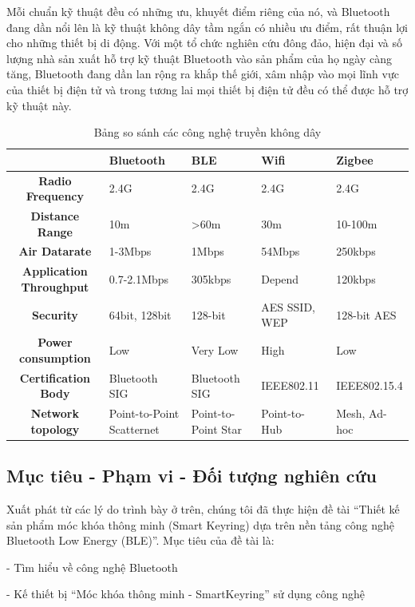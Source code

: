 Mỗi chuẩn kỹ thuật đều có những ưu, khuyết điểm riêng của nó, và Bluetooth đang dần nổi lên là kỹ thuật không dây tầm ngắn có nhiều ưu điểm, rất thuận lợi cho những thiết bị di động. Với một tổ chức nghiên cứu đông đảo, hiện đại và số lượng nhà sản xuất hỗ trợ kỹ thuật Bluetooth vào sản phẩm của họ ngày càng tăng, Bluetooth đang dần lan rộng ra khắp thế giới, xâm nhập vào mọi lĩnh vực của thiết bị điện tử và trong tương lai mọi thiết bị điện tử đều có thể được hỗ trợ kỹ thuật này.

	\begin{table}[ht]
		\begin{tabular}{ |c|m{2cm}|m{2cm}|m{2cm}|m{2cm}| } 
			\hline
			& \textbf{Bluetooth} & \textbf{BLE} & \textbf{Wifi} & \textbf{Zigbee} \\ 
			\hline
			\textbf{Radio Frequency} &	2.4G &	2.4G &	2.4G &	2.4G \\ 
			\hline
			\textbf{Distance Range} &	10m	&>60m &	30m	& 10-100m \\ 
			\hline
			\textbf{Air Datarate} &	1-3Mbps &	1Mbps &	54Mbps &	250kbps \\
			\hline
			\textbf{Application Throughput} &	0.7-2.1Mbps &	305kbps &Depend &120kbps\\
			\hline
			\textbf{Security} &	64bit, 128bit &	128-bit & AES	SSID, WEP&	128-bit AES \\
			\hline
			\textbf{Power consumption}&	Low	&Very Low&	High&	Low \\
			\hline
			\textbf{Certification Body}&	Bluetooth SIG&	Bluetooth SIG&	IEEE802.11&	IEEE802.15.4 \\
			\hline
			\textbf{Network topology} &	Point-to-Point Scatternet&	Point-to-Point Star&	Point-to-Hub& 		Mesh, Ad-hoc\\
			\hline
		\end{tabular}
		\caption {Bảng so sánh các công nghệ truyền không dây}
		\label{table:1.1}
	\end{table}
\subsection{Mục tiêu - Phạm vi - Đối tượng nghiên cứu}

Xuất phát từ các lý do trình bày ở trên, chúng tôi đã thực hiện đề tài “Thiết kế sản phẩm móc khóa thông minh (Smart Keyring) dựa trên nền tảng công nghệ Bluetooth Low Energy (BLE)”. Mục tiêu của đề tài là:

- Tìm hiểu về công nghệ Bluetooth

- Kế thiết bị “Móc khóa thông minh - SmartKeyring” sử dụng công nghệ

